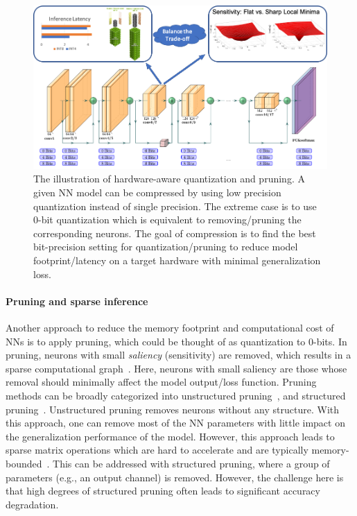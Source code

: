 \begin{figure}
\centering
\includegraphics[width=0.8\linewidth]{figures/pruning_quantization_illustration_nologo.png}
\caption{The illustration of hardware-aware quantization and pruning. 
A given NN model can be compressed by using low precision quantization instead
of single precision. The extreme case is to use 0-bit quantization which is 
equivalent to removing/pruning the corresponding neurons.
The goal of compression is to find the best bit-precision setting for
quantization/pruning to reduce model footprint/latency on a target hardware
with minimal generalization loss.
}
\label{fig:pruning_quantization}
\end{figure}

\paragraph*{Pruning and sparse inference}

Another approach to reduce the memory footprint and computational cost of NNs is to apply
pruning, which could be thought of as quantization to 0-bits. In pruning, neurons with small \emph{saliency} (sensitivity) are removed, which results in a sparse computational graph~\cite{lecun1990optimal}. 
Here, neurons with small saliency are those whose removal should minimally affect the model output/loss function.
Pruning methods can be broadly categorized into unstructured pruning~\cite{lecun1990optimal,hassibi1993second,dong2017learning, lee2018snip, xiao2019autoprune, park2020lookahead}, and structured pruning~\cite{luo2017thinet, he2018amc, yu2018nisp, lin2018accelerating, huang2018data, zhao2019variational}.
Unstructured pruning removes neurons without any structure.
With this approach, one can remove most of the NN parameters with little impact on the
generalization performance of the model.
However, this approach leads to sparse matrix operations which are hard to accelerate 
and are typically memory-bounded~\cite{buluc2008challenges,gale2019state,hoefler2021sparsity,blalock2020state}.
This can be addressed with structured pruning, where a
group of parameters (e.g., an output channel) is removed. However, the challenge here is that high degrees of structured
pruning often leads to significant accuracy degradation.

